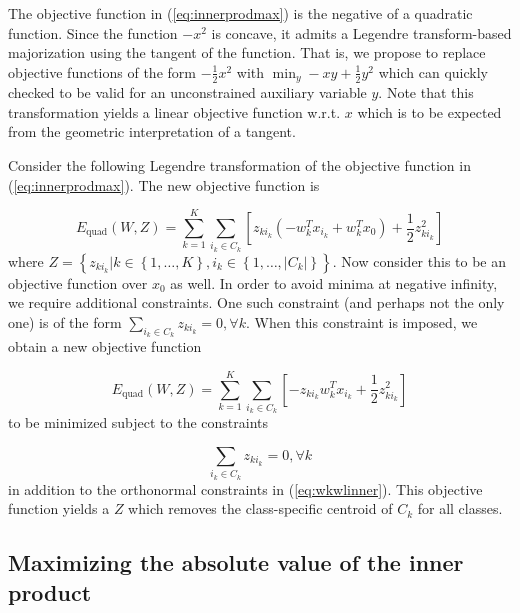 The objective function in (\ref{eq:innerprodmax}) is the negative
of a quadratic function. Since the function $-x^{2}$ is concave,
it admits a Legendre transform-based majorization \citep{yuille2003concave}
using the tangent of the function. That is, we propose to replace
objective functions of the form $-\frac{1}{2}x^{2}$ with $\min_{y}-xy+\frac{1}{2}y^{2}$
which can quickly checked to be valid for an unconstrained auxiliary
variable $y$. Note that this transformation yields a linear objective
function w.r.t. $x$ which is to be expected from the geometric interpretation
of a tangent. 

Consider the following Legendre transformation of the objective function
in (\ref{eq:innerprodmax}). The new objective function is 

\begin{equation}
E_{\mathrm{quad}}(W,Z)=\sum_{k=1}^{K}\sum_{i_{k}\in C_{k}}\left[z_{ki_{k}}\left(-w_{k}^{T}x_{i_{k}}+w_{k}^{T}x_{0}\right)+\frac{1}{2}z_{ki_{k}}^{2}\right]\label{eq:EWZ}
\end{equation}
where $Z=\left\{ z_{ki_{k}}|k\in\left\{ 1,\ldots,K\right\} ,i_{k}\in\left\{ 1,\ldots,|C_{k}|\right\} \right\} $.
Now consider this to be an objective function over $x_{0}$ as well.
In order to avoid minima at negative infinity, we require additional
constraints. One such constraint (and perhaps not the only one) is
of the form $\sum_{i_{k}\in C_{k}}z_{ki_{k}}=0,\forall k$. When this
constraint is imposed, we obtain a new objective function 

\begin{equation}
E_{\mathrm{quad}}(W,Z)=\sum_{k=1}^{K}\sum_{i_{k}\in C_{k}}\left[-z_{ki_{k}}w_{k}^{T}x_{i_{k}}+\frac{1}{2}z_{ki_{k}}^{2}\right]\label{eq:EWZ2}
\end{equation}
to be minimized subject to the constraints 

\begin{equation}
\sum_{i_{k}\in C_{k}}z_{ki_{k}}=0,\forall k\label{eq:sumzequalszero}
\end{equation}
in addition to the orthonormal constraints in (\ref{eq:wkwlinner}).
This objective function yields a $Z$ which removes the class-specific
centroid of $C_{k}$ for all classes.

\subsection{Maximizing the absolute value of the inner product}

